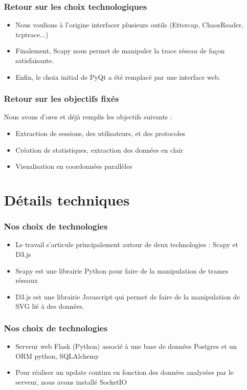 \documentclass{beamer}
\begin{document}
  \begin{frame}
   \frametitle{Retour sur les choix technologiques}
    \begin{itemize}
      \item Nous voulions à l'origine interfacer plusieurs outils (Ettercap, ChaosReader, tcptrace...) 
      \item Finalement, Scapy nous permet de manipuler la trace réseau de façon satisfaisante.
      \item Enfin, le choix initial de PyQt a été remplacé par une interface web.
    \end{itemize}
  \end{frame}
  
  \begin{frame}
  \frametitle{Retour sur les objectifs fixés}
    Nous avons d'ores et déjà remplis les objectifs suivants :
    \begin{itemize}
     \item Extraction de sessions, des utilisateurs, et des protocoles
     \item Création de statistiques, extraction des données en clair
     \item Visualisation en coordonnées parallèles
    \end{itemize}
  \end{frame}
  
  \section{Détails techniques}
  \begin{frame}
  \frametitle{Nos choix de technologies}
   \begin{itemize}
    \item Le travail s'articule principalement autour de deux technologies :
    Scapy et D3.js
    \item Scapy est une librairie Python pour faire de la manipulation de trames
    réseaux
    \item D3.js est une librairie Javascript qui permet de faire de la
    manipulation de SVG lié à des données.
   \end{itemize}
  \end{frame}
  
  \begin{frame}
  \frametitle{Nos choix de technologies}
   \begin{itemize}
    \item Serveur web Flask (Python) associé à une base de données Postgres et
    un ORM python, SQLAlchemy
    \item Pour réaliser un update continu en fonction des données analysées par
    le serveur, nous avons installé SocketIO
   \end{itemize}
  \end{frame}
  
\end{document}
